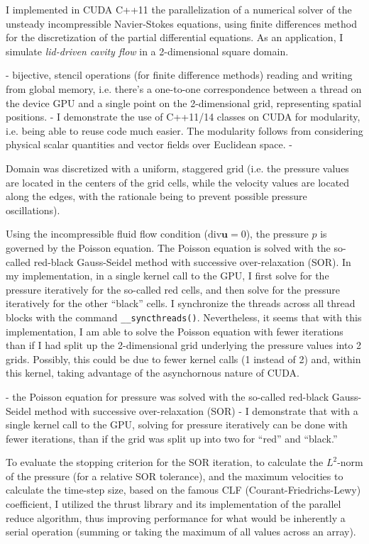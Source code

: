 \documentclass[10pt]{amsart}
\begin{document}
I implemented in CUDA C++11 the parallelization of a numerical solver of the unsteady incompressible Navier-Stokes equations, using finite differences method for the discretization of the partial differential equations.  As an application, I simulate \emph{lid-driven cavity flow} in a 2-dimensional square domain.

- bijective, stencil operations (for finite difference methods) reading and writing from global memory, i.e. there's a one-to-one correspondence between a thread on the device GPU and a single point on the 2-dimensional grid, representing spatial positions.
- I demonstrate the use of C++11/14 classes on CUDA for modularity, i.e. being able to reuse code much easier.  The modularity follows from considering physical scalar quantities and vector fields over Euclidean space.    
- 

Domain was discretized with a uniform, staggered grid (i.e. the pressure values are located in the centers of the grid cells, while the velocity values are located along the edges, with the rationale being to prevent possible pressure oscillations).

Using the incompressible fluid flow condition ($\text{div}\mathbf{u} =0$), the pressure $p$ is governed by the Poisson equation.  The Poisson equation is solved with the so-called red-black Gauss-Seidel method with successive over-relaxation (SOR).  In my implementation, in a single kernel call to the GPU, I first solve for the pressure iteratively for the so-called red cells, and then solve for the pressure iteratively for the other ``black'' cells.  I synchronize the threads across all thread blocks with the command \verb|__syncthreads()|.  Nevertheless, it seems that with this implementation, I am able to solve the Poisson equation with fewer iterations than if I had split up the 2-dimensional grid underlying the pressure values into 2 grids.  Possibly, this could be due to fewer kernel calls (1 instead of 2) and, within this kernel, taking advantage of the asynchornous nature of CUDA.

- the Poisson equation for pressure was solved with the so-called red-black Gauss-Seidel method with successive over-relaxation (SOR) - I demonstrate that with a single kernel call to the GPU, solving for pressure iteratively can be done with fewer iterations, than if the grid was split up into two for ``red'' and ``black.''  

To evaluate the stopping criterion for the SOR iteration, to calculate the $L^2$-norm of the pressure (for a relative SOR tolerance), and the maximum velocities to calculate the time-step size, based on the famous CLF (Courant-Friedrichs-Lewy) coefficient, I utilized the thrust library and its implementation of the parallel reduce algorithm, thus improving performance for what would be inherently a serial operation (summing or taking the maximum of all values across an array).
\end{document}
